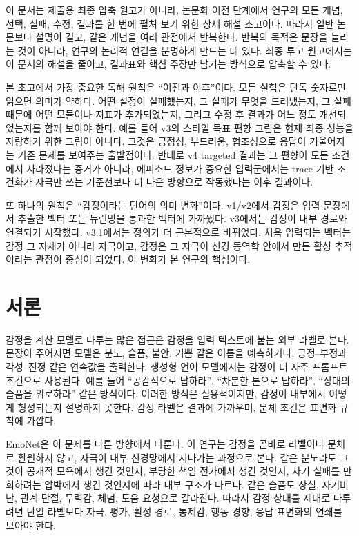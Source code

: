 \documentclass[11pt,a4paper]{article}
\begin{document}
이 문서는 제출용 최종 압축 원고가 아니라, 논문화 이전 단계에서 연구의 모든 개념, 선택, 실패, 수정, 결과를 한 번에 펼쳐 보기 위한 상세 해설 초고이다. 따라서 일반 논문보다 설명이 길고, 같은 개념을 여러 관점에서 반복한다. 반복의 목적은 문장을 늘리는 것이 아니라, 연구의 논리적 연결을 분명하게 만드는 데 있다. 최종 투고 원고에서는 이 문서의 해설을 줄이고, 결과표와 핵심 주장만 남기는 방식으로 압축할 수 있다.

본 초고에서 가장 중요한 독해 원칙은 ``이전과 이후''이다. 모든 실험은 단독 숫자로만 읽으면 의미가 약하다. 어떤 설정이 실패했는지, 그 실패가 무엇을 드러냈는지, 그 실패 때문에 어떤 모듈이나 지표가 추가되었는지, 그리고 수정 후 결과가 어느 정도 개선되었는지를 함께 보아야 한다. 예를 들어 v3의 스타일 목표 편향 그림은 현재 최종 성능을 자랑하기 위한 그림이 아니다. 그것은 긍정성, 부드러움, 협조성으로 응답이 기울어지는 기존 문제를 보여주는 출발점이다. 반대로 v4 targeted 결과는 그 편향이 모든 조건에서 사라졌다는 증거가 아니라, 에피소드 정보가 중요한 입력군에서는 trace 기반 조건화가 자극만 쓰는 기준선보다 더 나은 방향으로 작동했다는 이후 결과이다.

또 하나의 원칙은 ``감정이라는 단어의 의미 변화''이다. v1/v2에서 감정은 입력 문장에서 추출한 벡터 또는 뉴런망을 통과한 벡터에 가까웠다. v3에서는 감정이 내부 경로와 연결되기 시작했다. v3.1에서는 정의가 더 근본적으로 바뀌었다. 처음 입력되는 벡터는 감정 그 자체가 아니라 자극이고, 감정은 그 자극이 신경 동역학 안에서 만든 활성 추적이라는 관점이 중심이 되었다. 이 변화가 본 연구의 핵심이다.

\section{서론}

감정을 계산 모델로 다루는 많은 접근은 감정을 입력 텍스트에 붙는 외부 라벨로 본다. 문장이 주어지면 모델은 분노, 슬픔, 불안, 기쁨 같은 이름을 예측하거나, 긍정--부정과 각성--진정 같은 연속값을 출력한다. 생성형 언어 모델에서는 감정이 더 자주 프롬프트 조건으로 사용된다. 예를 들어 ``공감적으로 답하라'', ``차분한 톤으로 답하라'', ``상대의 슬픔을 위로하라'' 같은 방식이다. 이러한 방식은 실용적이지만, 감정이 내부에서 어떻게 형성되는지 설명하지 못한다. 감정 라벨은 결과에 가까우며, 문체 조건은 표면화 규칙에 가깝다.

EmoNet은 이 문제를 다른 방향에서 다룬다. 이 연구는 감정을 곧바로 라벨이나 문체로 환원하지 않고, 자극이 내부 신경망에서 지나가는 과정으로 본다. 같은 분노라도 그것이 공개적 모욕에서 생긴 것인지, 부당한 책임 전가에서 생긴 것인지, 자기 실패를 만회하려는 압박에서 생긴 것인지에 따라 내부 구조가 다르다. 같은 슬픔도 상실, 자기비난, 관계 단절, 무력감, 체념, 도움 요청으로 갈라진다. 따라서 감정 상태를 제대로 다루려면 단일 라벨보다 자극, 평가, 활성 경로, 통제감, 행동 경향, 응답 표면화의 연쇄를 보아야 한다.
\end{document}
